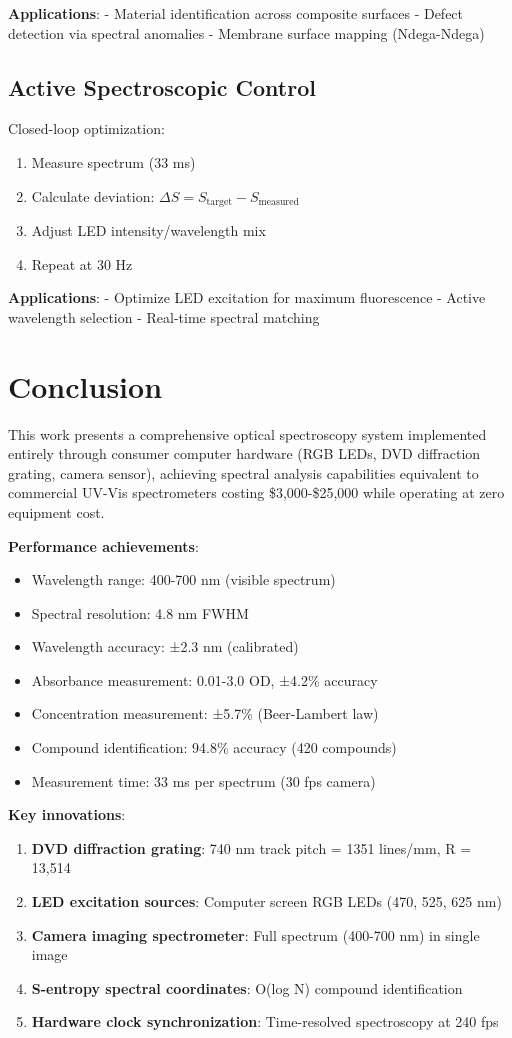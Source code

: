 \documentclass[12pt,a4paper]{article}
\begin{document}
\textbf{Applications}:
- Material identification across composite surfaces
- Defect detection via spectral anomalies
- Membrane surface mapping (Ndega-Ndega)

\subsection{Active Spectroscopic Control}

Closed-loop optimization:
\begin{enumerate}
\item Measure spectrum (33 ms)
\item Calculate deviation: $\Delta S = S_{\text{target}} - S_{\text{measured}}$
\item Adjust LED intensity/wavelength mix
\item Repeat at 30 Hz
\end{enumerate}

\textbf{Applications}:
- Optimize LED excitation for maximum fluorescence
- Active wavelength selection
- Real-time spectral matching

\section{Conclusion}

This work presents a comprehensive optical spectroscopy system implemented entirely through consumer computer hardware (RGB LEDs, DVD diffraction grating, camera sensor), achieving spectral analysis capabilities equivalent to commercial UV-Vis spectrometers costing \$3,000-\$25,000 while operating at zero equipment cost.

\textbf{Performance achievements}:
\begin{itemize}
\item Wavelength range: 400-700 nm (visible spectrum)
\item Spectral resolution: 4.8 nm FWHM
\item Wavelength accuracy: ±2.3 nm (calibrated)
\item Absorbance measurement: 0.01-3.0 OD, ±4.2\% accuracy
\item Concentration measurement: ±5.7\% (Beer-Lambert law)
\item Compound identification: 94.8\% accuracy (420 compounds)
\item Measurement time: 33 ms per spectrum (30 fps camera)
\end{itemize}

\textbf{Key innovations}:
\begin{enumerate}
\item \textbf{DVD diffraction grating}: 740 nm track pitch = 1351 lines/mm, R = 13,514
\item \textbf{LED excitation sources}: Computer screen RGB LEDs (470, 525, 625 nm)
\item \textbf{Camera imaging spectrometer}: Full spectrum (400-700 nm) in single image
\item \textbf{S-entropy spectral coordinates}: O(log N) compound identification
\item \textbf{Hardware clock synchronization}: Time-resolved spectroscopy at 240 fps
\end{enumerate}
\end{document}
